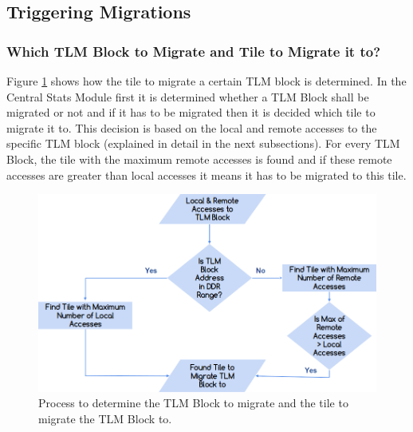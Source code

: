 \documentclass{listhesis}
\begin{document}
\subsection{Triggering Migrations}
\subsubsection{Which TLM Block to Migrate and Tile to Migrate it to?}
Figure \ref{fig:tiletomigrate} shows how the tile to migrate a certain TLM block is determined. In the Central Stats Module first it is determined whether a TLM Block shall be migrated or not and if it has to be migrated then it is decided which tile to migrate it to. This decision is based on the local and remote accesses to the specific TLM block (explained in detail in the next subsections). For every TLM Block, the tile with the maximum remote accesses is found and if these remote accesses are greater than local accesses it means it has to be migrated to this tile.\\
\begin{figure}
  \includegraphics[width=0.4\linewidth]{tiletomigrate.png}
  \centering
  \caption{Process to determine the TLM Block to migrate and the tile to migrate the TLM Block to.}
  \label{fig:tiletomigrate}
\end{figure}
\end{document}
